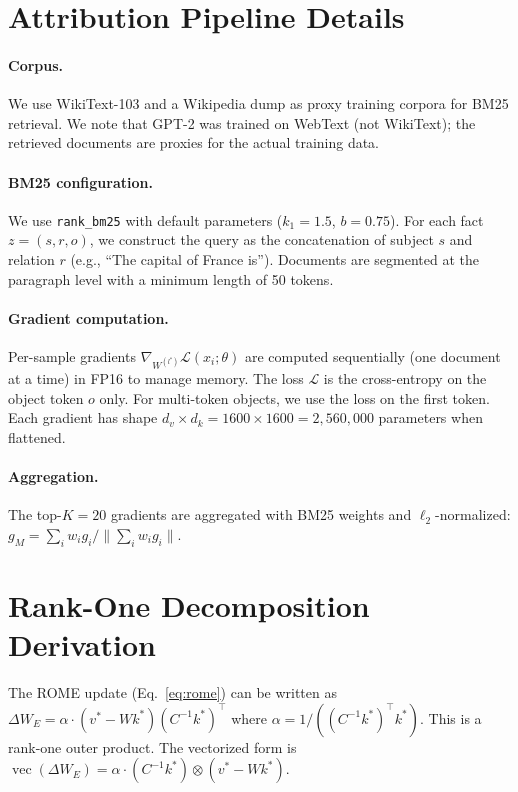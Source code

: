 \appendix

\section{Attribution Pipeline Details}
\label{app:attribution}

\paragraph{Corpus.}
We use WikiText-103 and a Wikipedia dump as proxy training corpora for BM25 retrieval.
We note that GPT-2 was trained on WebText (not WikiText); the retrieved documents are proxies for the actual training data.

\paragraph{BM25 configuration.}
We use \texttt{rank\_bm25} with default parameters ($k_1 = 1.5$, $b = 0.75$).
For each fact $z = (s, r, o)$, we construct the query as the concatenation of subject $s$ and relation $r$ (e.g., ``The capital of France is'').
Documents are segmented at the paragraph level with a minimum length of 50 tokens.

\paragraph{Gradient computation.}
Per-sample gradients $\nabla_{W^{(l^*)}} \mathcal{L}(x_i; \theta)$ are computed sequentially (one document at a time) in FP16 to manage memory.
The loss $\mathcal{L}$ is the cross-entropy on the object token $o$ only.
For multi-token objects, we use the loss on the first token.
Each gradient has shape $d_v \times d_k = 1600 \times 1600 = 2{,}560{,}000$ parameters when flattened.

\paragraph{Aggregation.}
The top-$K = 20$ gradients are aggregated with BM25 weights and $\ell_2$-normalized: $g_M = \sum_i w_i g_i / \|\sum_i w_i g_i\|$.

\section{Rank-One Decomposition Derivation}
\label{app:decomposition}

The ROME update (Eq.~\ref{eq:rome}) can be written as $\Delta W_E = \alpha \cdot (v^* - Wk^*)(C^{-1}k^*)^\top$ where $\alpha = 1/((C^{-1}k^*)^\top k^*)$.
This is a rank-one outer product.
The vectorized form is $\operatorname{vec}(\Delta W_E) = \alpha \cdot (C^{-1}k^*) \otimes (v^* - Wk^*)$.


